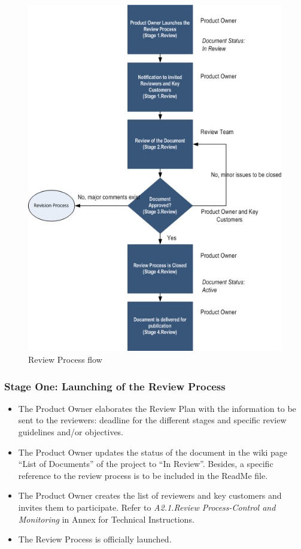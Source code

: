 \documentclass{template/openetcs_article}
\begin{document}
\begin{figure}[H]
\centering
\includegraphics{./figures/Review_Process.JPG}
\caption{Review Process flow}
\end{figure}


\subsubsection{Stage One: Launching of the Review Process}

\begin{itemize}
\item The Product Owner elaborates the Review Plan with the information to be sent to the reviewers: deadline for the different stages and specific review guidelines and/or objectives. 
\item The Product Owner updates the status of the document in the wiki page “List of Documents” of the project to “In Review”. Besides, a specific reference to the review process is to be included in the ReadMe file.
\item The Product Owner creates the list of reviewers and key customers and invites them to participate. Refer to {\it A2.1.Review Process-Control and Monitoring} in Annex for Technical Instructions.
\item The Review Process is officially launched.
\end{itemize}
\end{document}
